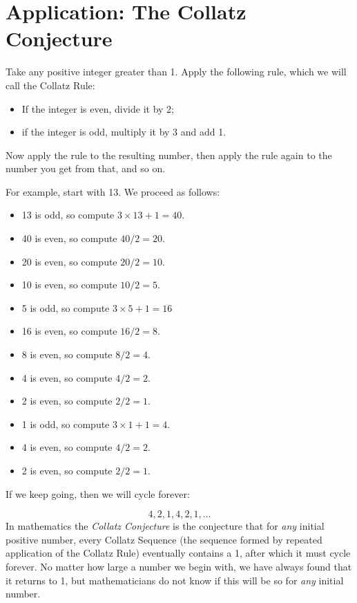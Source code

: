 \documentclass[]{book}
\providecommand{\tightlist}{%
  \setlength{\itemsep}{0pt}\setlength{\parskip}{0pt}}
\theoremstyle{definition}
\theoremstyle{definition}
\theoremstyle{remark}
\begin{document}
{\section{Application: The Collatz Conjecture}\label{collatz-conjecture}

Take any positive integer greater than 1. Apply the following rule,
which we will call the Collatz Rule:

\begin{itemize}
\tightlist
\item
  If the integer is even, divide it by 2;
\item
  if the integer is odd, multiply it by 3 and add 1.
\end{itemize}

Now apply the rule to the resulting number, then apply the rule again to
the number you get from that, and so on.

For example, start with 13. We proceed as follows:

\begin{itemize}
\tightlist
\item
  13 is odd, so compute \(3 \times 13 + 1 = 40\).
\item
  40 is even, so compute \(40/2 = 20\).
\item
  20 is even, so compute \(20/2 = 10\).
\item
  10 is even, so compute \(10/2 = 5\).
\item
  5 is odd, so compute \(3 \times 5+ 1 = 16\)
\item
  16 is even, so compute \(16/2 = 8\).
\item
  8 is even, so compute \(8/2 = 4\).
\item
  4 is even, so compute \(4/2 = 2\).
\item
  2 is even, so compute \(2/2 = 1\).
\item
  1 is odd, so compute \(3 \times 1 + 1 = 4\).
\item
  4 is even, so compute \(4/2 = 2\).
\item
  2 is even, so compute \(2/2 = 1\).
\end{itemize}

If we keep going, then we will cycle forever:

\[4, 2, 1, 4, 2, 1, \ldots\] In mathematics the \emph{Collatz
Conjecture} is the conjecture that for \emph{any} initial positive
number, every Collatz Sequence (the sequence formed by repeated
application of the Collatz Rule) eventually contains a 1, after which it
must cycle forever. No matter how large a number we begin with, we have
always found that it returns to 1, but mathematicians do not know if
this will be so for \emph{any} initial number.

}
\end{document}
